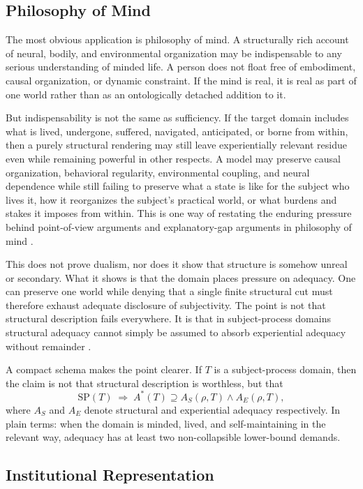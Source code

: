 \documentclass[11pt]{article}
\begin{document}
\subsection{Philosophy of Mind}

The most obvious application is philosophy of mind. A structurally rich account of neural, bodily, and environmental organization may be indispensable to any serious understanding of minded life. A person does not float free of embodiment, causal organization, or dynamic constraint. If the mind is real, it is real as part of one world rather than as an ontologically detached addition to it.

But indispensability is not the same as sufficiency. If the target domain includes what is lived, undergone, suffered, navigated, anticipated, or borne from within, then a purely structural rendering may still leave experientially relevant residue even while remaining powerful in other respects. A model may preserve causal organization, behavioral regularity, environmental coupling, and neural dependence while still failing to preserve what a state is like for the subject who lives it, how it reorganizes the subject's practical world, or what burdens and stakes it imposes from within. This is one way of restating the enduring pressure behind point-of-view arguments and explanatory-gap arguments in philosophy of mind \cite{Nagel1974,Levine1983,Chalmers1995}.

This does not prove dualism, nor does it show that structure is somehow unreal or secondary. What it shows is that the domain places pressure on adequacy. One can preserve one world while denying that a single finite structural cut must therefore exhaust adequate disclosure of subjectivity. The point is not that structural description fails everywhere. It is that in subject-process domains structural adequacy cannot simply be assumed to absorb experiential adequacy without remainder \cite{Nagel1974,Levine1983}.

A compact schema makes the point clearer. If \(T\) is a subject-process domain, then the claim is not that structural description is worthless, but that
\[
\mathrm{SP}(T)\;\Rightarrow\;A^{*}(T)\supseteq A_S(\rho,T)\wedge A_E(\rho,T),
\]
where \(A_S\) and \(A_E\) denote structural and experiential adequacy respectively. In plain terms: when the domain is minded, lived, and self-maintaining in the relevant way, adequacy has at least two non-collapsible lower-bound demands.

\subsection{Institutional Representation}
\end{document}
